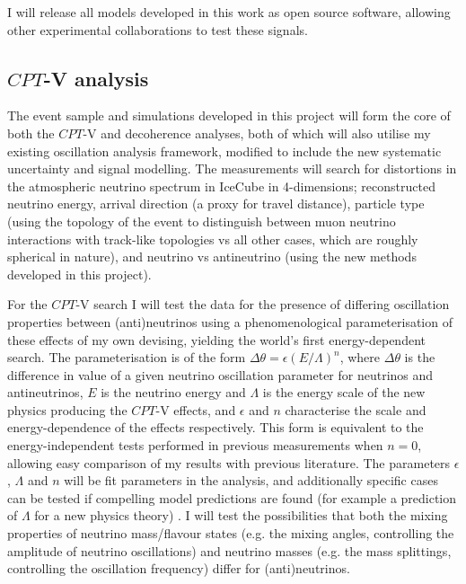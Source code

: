 \documentclass[a4paper,11pt]{article}
\begin{document}
I will release all models developed in this work as open source software, allowing other experimental collaborations to test these signals.  \\

\subsection{$CPT$-V analysis}

The event sample and simulations developed in this project will form the core of both the $CPT$-V and decoherence analyses, both of which will also utilise my existing oscillation analysis framework, modified to include the new systematic uncertainty and signal modelling. The measurements will search for distortions in the atmospheric neutrino spectrum in IceCube in 4-dimensions; reconstructed neutrino energy, arrival direction (a proxy for travel distance), particle type (using the topology of the event to distinguish between muon neutrino interactions with track-like topologies vs all other cases, which are roughly spherical in nature), and neutrino vs antineutrino (using the new methods developed in this project).

For the $CPT$-V search I will test the data for the presence of differing oscillation properties between (anti)neutrinos using a phenomenological parameterisation of these effects of my own devising, yielding the world's first energy-dependent search. The parameterisation is of the form $\Delta \theta = \epsilon (E/\Lambda)^n$, where $\Delta \theta$ is the difference in value of a given neutrino oscillation parameter for neutrinos and antineutrinos, $E$ is the neutrino energy and $\Lambda$ is the energy scale of the new physics producing the $CPT$-V effects, and $\epsilon$ and $n$ characterise the scale and energy-dependence of the effects respectively. This form is equivalent to the energy-independent tests performed in previous measurements when $n=0$, allowing easy comparison of my results with previous literature. The parameters $\epsilon$, $\Lambda$ and $n$ will be fit parameters in the analysis, and additionally specific cases can be tested if compelling model predictions are found (for example a prediction of $\Lambda$ for a new physics theory) . I will test the possibilities that both the mixing properties of neutrino mass/flavour states (e.g. the mixing angles, controlling the amplitude of neutrino oscillations) and neutrino masses (e.g. the mass splittings, controlling the oscillation frequency) differ for (anti)neutrinos. 
\end{document}
